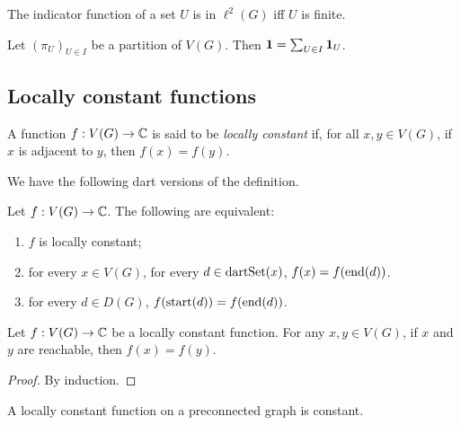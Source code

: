 \begin{lemma}
  \label{lem:indicator_ell2}
  The indicator function of a set $U$ is in $\ell^2(G)$ iff $U$ is finite.
\end{lemma}

\begin{lemma}
  \label{lem:partition_unity}
  Let $(\pi_U)_{U \in I}$ be a partition of $V(G)$. Then $\mathbf{1} = \sum_{U \in I} \mathbf{1}_U$.
\end{lemma}

\subsection{Locally constant functions}

\begin{definition}
  \label{def:locally_constant}
  A function $f : V(G) \rightarrow \mathbb{C}$ is said to be \emph{locally constant}
  if, for all $x,y \in V(G)$, if $x$ is adjacent to $y$, then $f(x)=f(y)$.
\end{definition}

We have the following dart versions of the definition.

\begin{lemma}
  \label{lem:dart_locally_constant}
  Let $f : V(G) \rightarrow \mathbb{C}$. The following are equivalent:
  \begin{enumerate}
    \item  $f$ is locally constant;
    \item for every $x \in V(G)$, for every $d \in \mathrm{dartSet}(x)$,
    $f(x)=f(\mathrm{end}(d))$.
    \item for every $d \in D(G)$, $f(\mathrm{start}(d))=f(\mathrm{end}(d))$.
  \end{enumerate}
\end{lemma}

\begin{lemma}
  \label{lem:locally_constant_walk}
  Let $f : V(G) \rightarrow \mathbb{C}$ be a locally constant function.
  For any $x, y \in V(G)$, if $x$ and $y$ are reachable, then $f(x)=f(y)$.
\end{lemma}

\begin{proof}
  By induction.
\end{proof}

\begin{lemma}
  \label{lem:locally_constant_preconnected}
  A locally constant function on a preconnected graph is constant.
\end{lemma}

